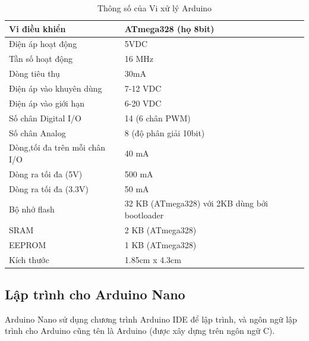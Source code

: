 \begin{center}
\begin{table}[]
\centering
\caption{Thông số của Vi xử lý Arduino}
\label{table:thongsoarduino}
\begin{tabular}{|l|l|}
\hline
Vi điều khiển                 & ATmega328 (họ 8bit)                           \\ \hline
Điện áp hoạt động             & 5VDC                                          \\ \hline
Tần số hoạt động              & 16 MHz                                        \\ \hline
Dòng tiêu thụ                 & 30mA                                          \\ \hline
Điện áp vào khuyên dùng       & 7-12 VDC                                      \\ \hline
Điện áp vào giới hạn          & 6-20 VDC                                      \\ \hline
Số chân Digital I/O           & 14 (6 chân PWM)                               \\ \hline
Số chân Analog                & 8 (độ phân giải 10bit)                        \\ \hline
Dòng,tối đa trên mỗi chân I/O & 40 mA                                         \\ \hline
Dòng ra tối đa (5V)           & 500 mA                                        \\ \hline
Dòng ra tối đa (3.3V)         & 50 mA                                         \\ \hline
Bộ nhớ flash                  & 32 KB (ATmega328) với 2KB dùng bởi bootloader \\ \hline
SRAM                          & 2 KB (ATmega328)                              \\ \hline
EEPROM                        & 1 KB (ATmega328)                              \\ \hline
Kích thước                    & 1.85cm x 4.3cm                                \\ \hline
\end{tabular}
\end{table}
\end{center}


\subsection*{Lập trình cho Arduino Nano}
Arduino Nano sử dụng chương trình Arduino IDE để lập trình, và ngôn ngữ lập trình cho Arduino cũng tên là Arduino (được xây dựng trên ngôn ngữ C). 

